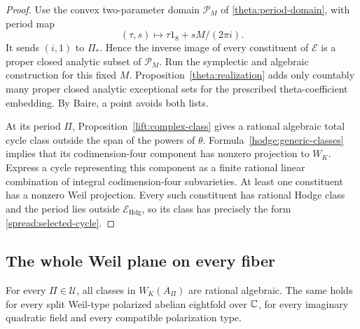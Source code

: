 \begin{proof}
Use the convex two-parameter domain $\mathcal P_M$ of
\eqref{theta:period-domain}, with period map
\[
 (\tau,s)\longmapsto\tau1_8+sM/(2\pi i).
\]
It sends $(i,1)$ to $\Pi_*$.  Hence the inverse image of every
constituent of $\mathcal E$ is a proper closed analytic subset of
$\mathcal P_M$.  Run the symplectic and algebraic construction for
this fixed $M$.  Proposition~\ref{theta:realization} adds only countably
many proper closed analytic exceptional sets for the prescribed
theta-coefficient embedding.  By Baire, a point avoids both lists.

At its period $\Pi$, Proposition~\ref{lift:complex-class} gives a
rational algebraic total cycle class outside the span of the powers
of $\theta$.  Formula~\eqref{hodge:generic-classes} implies that its
codimension-four component has nonzero projection to $W_K$.
Express a cycle representing this component as a finite rational
linear combination of integral codimension-four subvarieties.  At least
one constituent has a nonzero Weil projection.  Every such constituent
has rational Hodge class and the period lies outside
$\mathcal E_{\mathrm{Hdg}}$, so its class has precisely the form
\eqref{spread:selected-cycle}.
\end{proof}

\subsection{The whole Weil plane on every fiber}

\begin{theorem}
\label{spread:all-fibers}
For every $\Pi\in\mathcal U$, all classes in $W_K(A_\Pi)$ are
rational algebraic.  The same holds for every split Weil-type
polarized abelian eightfold over $\mathbb C$, for every imaginary quadratic
field and every compatible polarization type.
\end{theorem}


